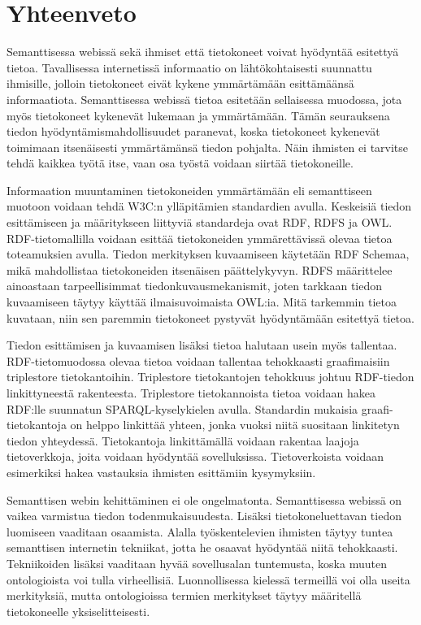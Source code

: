 \documentclass[finnish, 12pt, a4paper, elec, utf8, pdfa, online]{aaltothesis}
\begin{document}
{\section{Yhteenveto}
Semanttisessa webissä sekä ihmiset että tietokoneet voivat hyödyntää esitettyä tietoa. Tavallisessa internetissä informaatio on lähtökohtaisesti suunnattu ihmisille, jolloin tietokoneet eivät kykene ymmärtämään esittämäänsä informaatiota. Semanttisessa webissä tietoa esitetään sellaisessa muodossa, jota myös tietokoneet kykenevät lukemaan ja ymmärtämään. Tämän seurauksena tiedon hyödyntämismahdollisuudet paranevat, koska tietokoneet kykenevät toimimaan itsenäisesti ymmärtämänsä tiedon pohjalta. Näin ihmisten ei tarvitse tehdä kaikkea työtä itse, vaan osa työstä voidaan siirtää tietokoneille.

Informaation muuntaminen tietokoneiden ymmärtämään eli semanttiseen muotoon voidaan tehdä W3C:n ylläpitämien standardien avulla. Keskeisiä tiedon esittämiseen ja määritykseen liittyviä standardeja ovat RDF, RDFS ja OWL. RDF-tietomallilla voidaan esittää tietokoneiden ymmärettävissä olevaa tietoa toteamuksien avulla. Tiedon merkityksen kuvaamiseen käytetään RDF Schemaa, mikä mahdollistaa tietokoneiden itsenäisen päättelykyvyn. RDFS määrittelee ainoastaan tarpeellisimmat tiedonkuvausmekanismit, joten tarkkaan tiedon kuvaamiseen täytyy käyttää ilmaisuvoimaista OWL:ia. Mitä tarkemmin tietoa kuvataan, niin sen paremmin tietokoneet pystyvät hyödyntämään esitettyä tietoa.

Tiedon esittämisen ja kuvaamisen lisäksi tietoa halutaan usein myös tallentaa. RDF-tietomuodossa olevaa tietoa voidaan tallentaa tehokkaasti graafimaisiin triplestore tietokantoihin. Triplestore tietokantojen tehokkuus johtuu RDF-tiedon linkittyneestä rakenteesta. Triplestore tietokannoista tietoa voidaan hakea RDF:lle suunnatun SPARQL-kyselykielen avulla. Standardin mukaisia graafi-tietokantoja on helppo linkittää yhteen, jonka vuoksi niitä suositaan linkitetyn tiedon yhteydessä. Tietokantoja linkittämällä voidaan rakentaa laajoja tietoverkkoja, joita voidaan hyödyntää sovelluksissa. Tietoverkoista voidaan esimerkiksi hakea vastauksia ihmisten esittämiin kysymyksiin.

Semanttisen webin kehittäminen ei ole ongelmatonta. Semanttisessa webissä on vaikea varmistua tiedon todenmukaisuudesta. Lisäksi tietokoneluettavan tiedon luomiseen vaaditaan osaamista. Alalla työskentelevien ihmisten täytyy tuntea semanttisen internetin tekniikat, jotta he osaavat hyödyntää niitä tehokkaasti. Tekniikoiden lisäksi vaaditaan hyvää sovellusalan tuntemusta, koska muuten ontologioista voi tulla virheellisiä. Luonnollisessa kielessä termeillä voi olla useita merkityksiä, mutta ontologioissa termien merkitykset täytyy määritellä tietokoneelle yksiselitteisesti.

}
\end{document}
